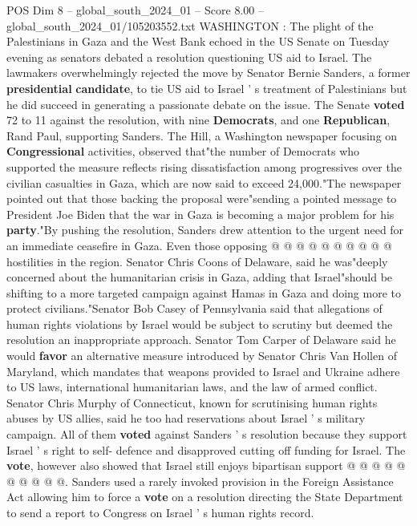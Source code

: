 \begin{textsample}{POS Dim 8 – global\_south\_2024\_01 – Score 8.00 – global\_south\_2024\_01/105203552.txt}  \label{ex:f8_pos_280}
WASHINGTON : The plight of the Palestinians in Gaza and the West Bank echoed in the US Senate on Tuesday evening as senators debated a resolution questioning US aid to Israel.
The lawmakers overwhelmingly rejected the move by Senator Bernie Sanders, a former \textbf{presidential} \textbf{candidate}, to tie US aid to Israel ' s treatment of Palestinians but he did succeed in generating a passionate debate on the issue.
The Senate \textbf{voted} 72 to 11 against the resolution, with nine \textbf{Democrats}, and one \textbf{Republican}, Rand Paul, supporting Sanders.
The Hill, a Washington newspaper focusing on \textbf{Congressional} activities, observed that"the number of Democrats who supported the measure reflects rising dissatisfaction among progressives over the civilian casualties in Gaza, which are now said to exceed 24,000."The newspaper pointed out that those backing the proposal were"sending a pointed message to President Joe Biden that the war in Gaza is becoming a major problem for his \textbf{party}."By pushing the resolution, Sanders drew attention to the urgent need for an immediate ceasefire in Gaza.
Even those opposing @ @ @ @ @ @ @ @ @ @ hostilities in the region.
Senator Chris Coons of Delaware, said he was"deeply concerned about the humanitarian crisis in Gaza, adding that Israel"should be shifting to a more targeted campaign against Hamas in Gaza and doing more to protect civilians."Senator Bob Casey of Pennsylvania said that allegations of human rights violations by Israel would be subject to scrutiny but deemed the resolution an inappropriate approach.
Senator Tom Carper of Delaware said he would \textbf{favor} an alternative measure introduced by Senator Chris Van Hollen of Maryland, which mandates that weapons provided to Israel and Ukraine adhere to US laws, international humanitarian laws, and the law of armed conflict.
Senator Chris Murphy of Connecticut, known for scrutinising human rights abuses by US allies, said he too had reservations about Israel ' s military campaign.
All of them \textbf{voted} against Sanders ' s resolution because they support Israel ' s right to self- defence and disapproved cutting off funding for Israel.
The \textbf{vote}, however also showed that Israel still enjoys bipartisan support @ @ @ @ @ @ @ @ @ @.
Sanders used a rarely invoked provision in the Foreign Assistance Act allowing him to force a \textbf{vote} on a resolution directing the State Department to send a report to Congress on Israel ' s human rights record.

\end{textsample}
